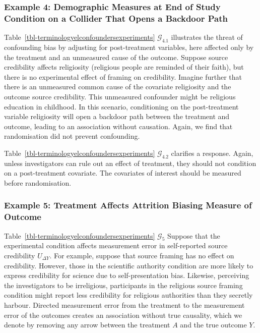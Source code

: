 \documentclass[
  single column]{article}
\begin{document}
\subsubsection{Example 4: Demographic Measures at End of Study Condition
on a Collider That Opens a Backdoor
Path}\label{example-4-demographic-measures-at-end-of-study-condition-on-a-collider-that-opens-a-backdoor-path}

Table~\ref{tbl-terminologyelconfoundersexperiments}
\(\mathcal{G}_{4.1}\) illustrates the threat of confounding bias by
adjusting for post-treatment variables, here affected only by the
treatment and an unmeasured cause of the outcome. Suppose source
credibility affects religiosity (religious people are reminded of their
faith), but there is no experimental effect of framing on credibility.
Imagine further that there is an unmeasured common cause of the
covariate religiosity and the outcome source credibility. This
unmeasured confounder might be religious education in childhood. In this
scenario, conditioning on the post-treatment variable religiosity will
open a backdoor path between the treatment and outcome, leading to an
association without causation. Again, we find that randomisation did not
prevent confounding.

Table~\ref{tbl-terminologyelconfoundersexperiments}
\(\mathcal{G}_{4.2}\) clarifies a response. Again, unless investigators
can rule out an effect of treatment, they should not condition on a
post-treatment covariate. The covariates of interest should be measured
before randomisation.

\subsubsection{Example 5: Treatment Affects Attrition Biasing Measure of
Outcome}\label{example-5-treatment-affects-attrition-biasing-measure-of-outcome}

Table~\ref{tbl-terminologyelconfoundersexperiments} \(\mathcal{G}_{5}\)
Suppose that the experimental condition affects measurement error in
self-reported source credibility \(U_{\Delta Y}\). For example, suppose
that source framing has no effect on credibility. However, those in the
scientific authority condition are more likely to express credibility
for science due to self-presentation bias. Likewise, perceiving the
investigators to be irreligious, participants in the religious source
framing condition might report less credibility for religious
authorities than they secretly harbour. Directed measurement error from
the treatment to the measurement error of the outcomes creates an
association without true causality, which we denote by removing any
arrow between the treatment \(A\) and the true outcome \(Y\).
\end{document}

